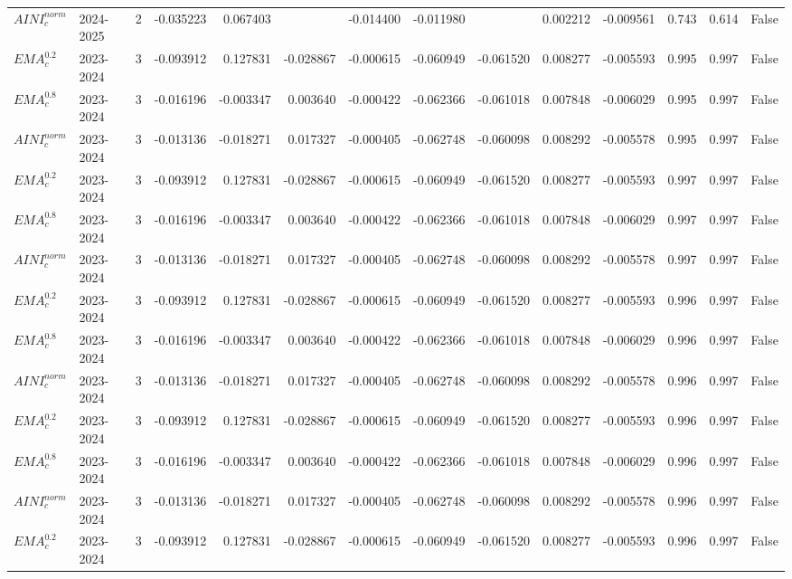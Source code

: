 \begin{tabular}{@{}llrrrrrrrrrlll@{}}
$AINI^{norm}_{c}$ & 2024-2025 & 2 & -0.035223 & 0.067403 &  & -0.014400 & -0.011980 &  & 0.002212 & -0.009561 & 0.743 & 0.614 & False \\
$EMA^{0.2}_{c}$ & 2023-2024 & 3 & -0.093912 & 0.127831 & -0.028867 & -0.000615 & -0.060949 & -0.061520 & 0.008277 & -0.005593 & 0.995 & 0.997 & False \\
$EMA^{0.8}_{c}$ & 2023-2024 & 3 & -0.016196 & -0.003347 & 0.003640 & -0.000422 & -0.062366 & -0.061018 & 0.007848 & -0.006029 & 0.995 & 0.997 & False \\
$AINI^{norm}_{c}$ & 2023-2024 & 3 & -0.013136 & -0.018271 & 0.017327 & -0.000405 & -0.062748 & -0.060098 & 0.008292 & -0.005578 & 0.995 & 0.997 & False \\
$EMA^{0.2}_{c}$ & 2023-2024 & 3 & -0.093912 & 0.127831 & -0.028867 & -0.000615 & -0.060949 & -0.061520 & 0.008277 & -0.005593 & 0.997 & 0.997 & False \\
$EMA^{0.8}_{c}$ & 2023-2024 & 3 & -0.016196 & -0.003347 & 0.003640 & -0.000422 & -0.062366 & -0.061018 & 0.007848 & -0.006029 & 0.997 & 0.997 & False \\
$AINI^{norm}_{c}$ & 2023-2024 & 3 & -0.013136 & -0.018271 & 0.017327 & -0.000405 & -0.062748 & -0.060098 & 0.008292 & -0.005578 & 0.997 & 0.997 & False \\
$EMA^{0.2}_{c}$ & 2023-2024 & 3 & -0.093912 & 0.127831 & -0.028867 & -0.000615 & -0.060949 & -0.061520 & 0.008277 & -0.005593 & 0.996 & 0.997 & False \\
$EMA^{0.8}_{c}$ & 2023-2024 & 3 & -0.016196 & -0.003347 & 0.003640 & -0.000422 & -0.062366 & -0.061018 & 0.007848 & -0.006029 & 0.996 & 0.997 & False \\
$AINI^{norm}_{c}$ & 2023-2024 & 3 & -0.013136 & -0.018271 & 0.017327 & -0.000405 & -0.062748 & -0.060098 & 0.008292 & -0.005578 & 0.996 & 0.997 & False \\
$EMA^{0.2}_{c}$ & 2023-2024 & 3 & -0.093912 & 0.127831 & -0.028867 & -0.000615 & -0.060949 & -0.061520 & 0.008277 & -0.005593 & 0.996 & 0.997 & False \\
$EMA^{0.8}_{c}$ & 2023-2024 & 3 & -0.016196 & -0.003347 & 0.003640 & -0.000422 & -0.062366 & -0.061018 & 0.007848 & -0.006029 & 0.996 & 0.997 & False \\
$AINI^{norm}_{c}$ & 2023-2024 & 3 & -0.013136 & -0.018271 & 0.017327 & -0.000405 & -0.062748 & -0.060098 & 0.008292 & -0.005578 & 0.996 & 0.997 & False \\
$EMA^{0.2}_{c}$ & 2023-2024 & 3 & -0.093912 & 0.127831 & -0.028867 & -0.000615 & -0.060949 & -0.061520 & 0.008277 & -0.005593 & 0.996 & 0.997 & False \\

\end{tabular}
